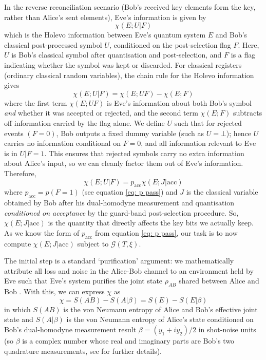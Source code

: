 ﻿\documentclass[12pt]{article}
\begin{document}
In the reverse reconciliation scenario (Bob's received key elements form the key, rather than Alice's sent elements), Eve's information is given by
\begin{equation}
\chi(E;U|F)
\end{equation}
which is the Holevo information between Eve's quantum system $E$ and Bob's classical post-processed symbol $U$, conditioned on the post-selection flag $F$. Here, $U$ is Bob's classical symbol after quantisation and post-selection, and $F$ is a flag indicating whether the symbol was kept or discarded. For classical registers (ordinary classical random variables), the chain rule for the Holevo information gives
\begin{equation}
  \chi(E;U|F) = \chi(E;UF) - \chi(E;F)
\end{equation}
where the first term $\chi(E;UF)$ is Eve's information about both Bob's symbol \textit{and} whether it was accepted or rejected, and the second term $\chi(E;F)$ subtracts off information carried by the flag alone. We define $U$ such that for rejected events $(F = 0)$, Bob outputs a fixed dummy variable (such as $U = \bot$); hence $U$ carries no information conditional on $F = 0$, and all information relevant to Eve is in $U|F=1$. This ensures that rejected symbols carry no extra information about Alice's input, so we can cleanly factor them out of Eve's information. Therefore,
\begin{equation}
  \chi(E;U|F) = p_\text{acc} \chi(E;J|\text{acc})
\end{equation}
where $p_\text{acc} = p(F = 1)$ (see equation \eqref{eq: p pass}) and $J$ is the classical variable obtained by Bob after his dual-homodyne measurement and quantisation \textit{conditioned on acceptance} by the guard-band post-selection procedure. So, $\chi(E;J|\text{acc})$ is the quantity that directly affects the key bits we actually keep. As we know the form of $p_\text{acc}$ from equation \eqref{eq: p pass}, our task is to now compute $\chi(E;J|\text{acc})$ subject to $\mathcal{G}(T, \xi)$.

The initial step is a standard `purification' argument: we mathematically attribute all loss and noise in the Alice-Bob channel to an environment held by Eve such that Eve's system purifies the joint state $\rho_{AB}$ shared between Alice and Bob \cite{Laudenbach-2018}. With this, we can express $\chi$ as
\begin{equation}
\label{eq: chi EB von Neumann}
\chi = S(AB) - S(A|\beta) = S(E) - S(E|\beta)
\end{equation}
in which $S(AB)$ is the von Neumann entropy of Alice and Bob's effective joint state and $S(A|\beta)$ is the von Neumann entropy of Alice's state conditioned on Bob's dual-homodyne measurement result $\beta = (y_1 + i y_2)/2$ in shot-noise units (so $\beta$ is a complex number whose real and imaginary parts are Bob's two quadrature measurements, see  for further details).
\end{document}

